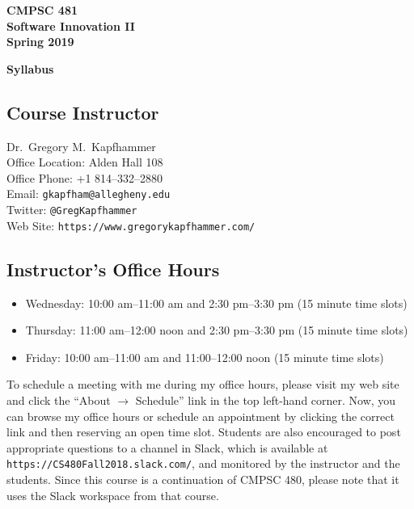 \documentclass[11pt]{article}
\newcommand{\url}[1]{\lstinline{#1}}
\newcommand{\syllabustitle}[1]
{
  \begin{center}
    \begin{center}
      \bf
      CMPSC 481\\Software Innovation II\\
      Spring 2019\\
      \medskip
    \end{center}
    \bf
    #1
  \end{center}
}
\begin{document}
\thispagestyle{empty}

\syllabustitle{Syllabus}

\vspace*{-1em}
\subsection*{Course Instructor}
Dr.\ Gregory M.\ Kapfhammer\\
\noindent Office Location: Alden Hall 108 \\
\noindent Office Phone: +1 814--332--2880 \\
\noindent Email: \url{gkapfham@allegheny.edu} \\
\noindent Twitter: \url{@GregKapfhammer} \\
\noindent Web Site: \url{https://www.gregorykapfhammer.com/}

\subsection*{Instructor's Office Hours}

\begin{itemize}

  \itemsep0em

  \item Wednesday: 10:00 am--11:00 am and 2:30 pm--3:30 pm (15 minute time slots)

  \item Thursday: 11:00 am--12:00 noon and 2:30 pm--3:30 pm (15 minute time slots)

  \item Friday: 10:00 am--11:00 am and 11:00--12:00 noon (15 minute time slots)

\end{itemize}


\noindent To schedule a meeting with me during my office hours, please visit my
web site and click the ``About $\rightarrow$ Schedule'' link in the top
left-hand corner. Now, you can browse my office hours or schedule an appointment
by clicking the correct link and then reserving an open time slot. Students are
also encouraged to post appropriate questions to a channel in Slack, which is
available at \url{https://CS480Fall2018.slack.com/}, and monitored by the
instructor and the students. Since this course is a continuation of CMPSC 480,
please note that it uses the Slack workspace from that course.
\end{document}
